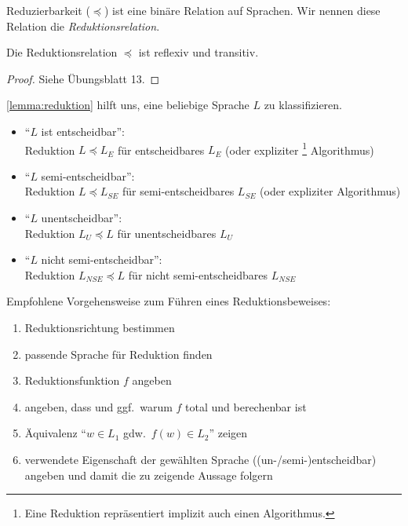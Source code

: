 Reduzierbarkeit ($\preceq$) ist eine binäre Relation auf Sprachen.
Wir nennen diese Relation die \emph{Reduktionsrelation}.

\begin{Satz}
	Die Reduktionsrelation $\preceq$ ist reflexiv und transitiv.
\end{Satz}

\begin{proof}
	Siehe Übungsblatt 13.
\end{proof}


\begin{Bemerkung}
	\autoref{lemma:reduktion} hilft uns, eine beliebige Sprache $L$ zu klassifizieren.
	\begin{itemize}
		\item "`$L$ ist entscheidbar"': \\
		Reduktion $L \preceq L_E$ für entscheidbares $L_E$ (oder expliziter%
		\footnote{Eine Reduktion repräsentiert implizit auch einen Algorithmus.}
		Algorithmus)
		\item "`$L$ semi-entscheidbar"': \\
		Reduktion $L \preceq L_{SE}$ für semi-entscheidbares $L_{SE}$ (oder expliziter Algorithmus)
		\item "`$L$ unentscheidbar"': \\
		Reduktion $L_U \preceq L$ für unentscheidbares $L_U$
		\item "`$L$ nicht semi-entscheidbar"': \\
		Reduktion $L_{NSE} \preceq L$ für nicht semi-entscheidbares $L_{NSE}$
		\qedhere
	\end{itemize}
\end{Bemerkung}

\begin{Bemerkung}
	Empfohlene Vorgehensweise zum Führen eines Reduktionsbeweises:
	\begin{enumerate}
		\item Reduktionsrichtung bestimmen

		\item passende Sprache für Reduktion finden

		\item Reduktionsfunktion $f$ angeben

		\item angeben, dass und ggf.\ warum $f$ total und berechenbar ist

		\item Äquivalenz "`$w \in L_1$ gdw.\ $f(w) \in L_2$"' zeigen

		\item verwendete Eigenschaft der gewählten Sprache ((un-/semi-)entscheidbar) angeben
		und damit die zu zeigende Aussage folgern
		\qedhere
	\end{enumerate}
\end{Bemerkung}

